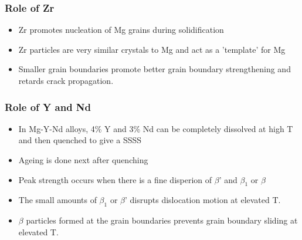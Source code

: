 
\subsubsection{Role of Zr} %
\label{ssub:role_of_zr}
\begin{itemize}
  \item Zr promotes nucleation of Mg grains during solidification
  \item Zr particles are very similar crystals to Mg and act as a 'template' for Mg
  \item Smaller grain boundaries promote better grain boundary strengthening and retards crack propagation.
\end{itemize}

\subsubsection{Role of Y and Nd} %
\label{ssub:role_of_y_and_nd}

\begin{itemize}
  \item In Mg-Y-Nd alloys, 4\% Y and 3\% Nd can be completely dissolved at high T and then quenched to give a SSSS
  \item Ageing is done next after quenching
  \item Peak strength occurs when there is a fine disperion of $\beta$' and $\beta_1$ or $\beta$
  \item The small amounts of $\beta_1$ or $\beta$' disrupts dislocation motion at elevated T.
  \item $\beta$ particles formed at the grain boundaries prevents grain boundary sliding at elevated T.
\end{itemize}

